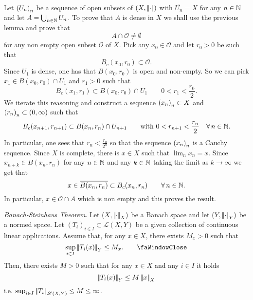 \documentclass{article}
\begin{document}
\begin{fancyproof}
	Let ${\left({U}_{n}\right)}_{n}$ be a sequence of open subsets of $\left(X,\left|\negthinspace\left|\cdot\right|\negthinspace\right|\right)$ with $\overline{U_{n}}=X$ for any $n\in\mathbb{N}$ and let $A=\bigcup_{n\in\mathbb{N}}U_{n}$. To prove that $A$ is dense in $X$ we shall use the previous lemma and prove that 
	\begin{equation*}
		A\cap\mathcal{O}\neq\emptyset
	\end{equation*}
	for any non empty open subset $\mathcal{O}$ of $X$. Pick any $x_{0}\in\mathcal{O}$ and let $r_{0}>0$ be such that
	\begin{equation*}
		B_{c}(x_{0},r_{0})\subset\mathcal{O}.
	\end{equation*}
	Since $U_{1}$ is dense, one has that $B(x_{0},r_{0})$ is open and non-empty. So we can pick $x_{1}\in B(x_{0},r_{0})\cap U_{1}$ and $r_{1}>0$ such that
	\begin{equation*}
		B_{c}(x_{1},r_{1})\subset B(x_{0},r_{0})\cap U_{1}\qquad0<r_{1}<\frac{r_{0}}{2}.
	\end{equation*}
	We iterate this reasoning and construct a sequence ${\left({x}_{n}\right)}_{n}\subset{X}$ and ${\left({r}_{n}\right)}_{n}\subset(0,\infty)$ such that
	\begin{equation*}
		B_{c}(x_{n+1},r_{n+1})\subset B(x_{n},r_{n})\cap U_{n+1}\qquad\text{with }0<r_{n+1}<\frac{r_{n}}{2}\quad\forall\, n\in\mathbb{N}.
	\end{equation*}
	In particular, one sees that $r_{n}<\frac{r_{0}}{2^{n}}$ so that the sequence ${\left({x}_{n}\right)}_{n}$ is a Cauchy sequence. Since $X$ is complete, there is $x\in X$ such that $\lim_{n}x_{n}=x$. Since $x_{n+k}\in B(x_{n},r_{n})$ for any $n\in\mathbb{N}$ and any $k\in\mathbb{N}$ taking the limit as $k\to\infty$ we get that
	\begin{equation*}
		x\in\overline{B(x_{n},r_{n})}\subset B_{c}(x_{n},r_{n})\qquad\forall\, n\in\mathbb{N}.
	\end{equation*}
	In particular, $x\in\mathcal{O}\cap A$ which is non empty and this proves the result.
\end{fancyproof}
\begin{theorem}
	\emph{Banach-Steinhaus Theorem}. Let $\left(X,\left|\negthinspace\left|\cdot\right|\negthinspace\right|_{X}\right)$ be a Banach space and let $\left(Y,\left|\negthinspace\left|\cdot\right|\negthinspace\right|_{Y}\right)$ be a normed space. Let $\left(T_{t}\right)_{i\in I}\subset\mathscr{L}(X,Y)$ be a given collection of continuous linear applications. Assume that, for any $x\in X$, there exists $M_{x}>0$ such that
	\begin{equation*}
		\sup_{i\in I}\norm{T_{i}(x)}_{Y}\leq M_{x}.\tag*{\faWindowClose}\label{winmax}
	\end{equation*}
	Then, there exists $M>0$ such that for any $x\in X$ and any $i\in I$ it holds
	\begin{equation*}
		\left|\negthinspace\left|T_{i}(x)\right|\negthinspace\right|_{Y}\leq M\left|\negthinspace\left|x\right|\negthinspace\right|_{X}
	\end{equation*}
	i.e. $\sup_{i\in I}\left|\negthinspace\left|T_{i}\right|\negthinspace\right|_{\mathscr{L}(X,Y)}\leq M\leq\infty$.
\end{theorem}
\end{document}
